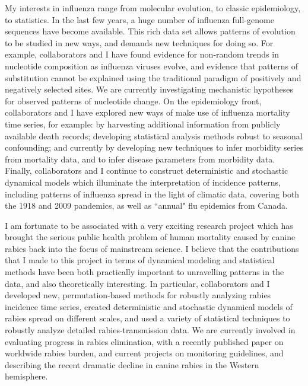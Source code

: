 \documentclass[12pt,a4paper]{article}
\begin{document}
My interests in influenza range from molecular evolution, to classic epidemiology, to statistics.  In the last few years, a huge number of influenza full-genome sequences have become available.  This rich data set allows patterns of evolution to be studied in new ways, and demands new techniques for doing so.  For example, collaborators and I have found evidence for non-random trends in nucleotide composition as influenza viruses evolve, and evidence that patterns of substitution cannot be explained using the traditional paradigm of positively and negatively selected sites.  We are currently investigating mechanistic hypotheses for observed patterns of nucleotide change.  On the epidemiology front, collaborators and I have explored new ways of make use of influenza mortality time series, for example: by harvesting additional information from publicly available death records; developing statistical analysis methods robust to seasonal confounding; and currently by developing new techniques to infer morbidity series from mortality data, and to infer disease parameters from morbidity data.  Finally, collaborators and I continue to construct deterministic and stochastic dynamical models which illuminate the interpretation of incidence patterns, including patterns of influenza spread in the light of climatic data, covering both the 1918 and 2009 pandemics, as well as ``annual" flu epidemics from Canada.

I am fortunate to be associated with a very exciting research project which has brought the serious public health problem of human mortality caused by canine rabies back into the focus of mainstream science.  I believe that the contributions that I made to this project in terms of dynamical modeling and statistical methods have been both practically important to unravelling patterns in the data, and also theoretically interesting.  In particular, collaborators and I developed new, permutation-based methods for robustly analyzing rabies incidence time series, created deterministic and stochastic dynamical models of rabies spread on different scales, and used a variety of statistical techniques to robustly analyze detailed rabies-transmission data. We are currently involved in evaluating progress in rabies elimination, with a recently published paper on worldwide rabies burden, and current projects on monitoring guidelines, and describing the recent dramatic decline in canine rabies in the Western hemisphere.
\end{document}
